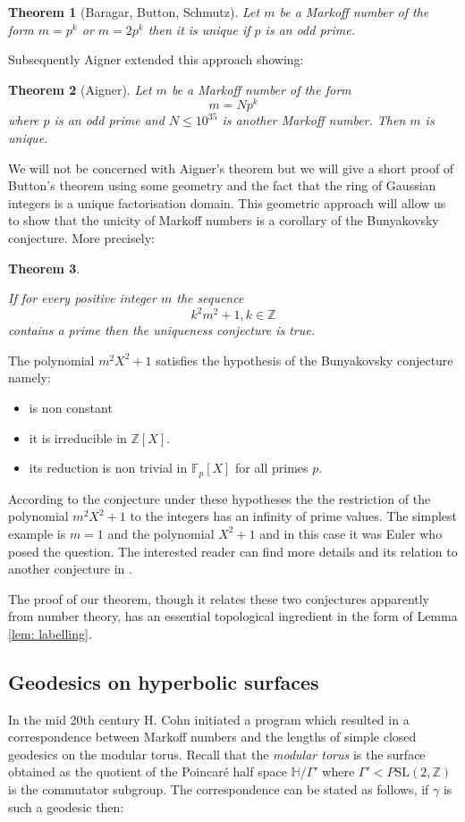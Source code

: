\documentclass[12pt,a4paper]{amsart}
\newtheorem{thm}{Theorem}[section]
\def\HH{\mathbb{H}}
\def\ZZ{\mathbb{Z}}
\def\sl2{\mathrm{SL}(2, \ZZ)}
\begin{document}
 \begin{thm}[Baragar, Button, Schmutz] \label{button}
 Let $m$ be a Markoff number of the form 
 $m=p^k$ or $m=2p^k$ then it is unique
if $p$ is an odd prime.
 \end{thm}


Subsequently Aigner extended  this approach showing:
 
 \begin{thm}[Aigner]
 Let $m$ be a Markoff number of the form 
 $$m =Np^k$$
 where $p$ is an odd prime and $N \leq 10^{35}$ is another Markoff number. Then $m$ is unique.
 \end{thm}

We will not be concerned with Aigner's theorem but we will give a short proof
of Button's theorem using some geometry and the fact that the ring of Gaussian
integers is a unique factorisation domain. This geometric approach will allow
us to show that the unicity of Markoff numbers is a corollary of the
Bunyakovsky conjecture. More precisely:

\begin{thm}\label{main}

If for every positive integer $m$ the sequence $$k^2m^2 + 1, k \in \ZZ$$ contains a
prime then the uniqueness conjecture is true.

\end{thm}

The polynomial $m^2 X^2 + 1$ satisfies the hypothesis of the Bunyakovsky conjecture namely:
\begin{itemize}
\item is non constant
\item it is irreducible in  $\ZZ[X]$.
\item its reduction is non trivial in $\mathbb{F}_p[X]$ for all primes $p$.
\end{itemize}

According to the conjecture under these hypotheses the the restriction of the
polynomial  $m^2 X^2 + 1$ to the integers has an infinity of prime values. The
simplest example is $m=1$ and the polynomial $X^2 + 1$ and in this case it was
Euler who posed the question. The interested reader can find more details and
its relation to another conjecture in \cite{Pollack}.

The proof of our theorem, though it relates these two conjectures apparently from
number theory, has an essential topological ingredient in the form of Lemma
\ref{lem: labelling}.


\subsection{Geodesics on hyperbolic surfaces} In the mid 20th century H. Cohn
initiated a program which resulted in a correspondence between Markoff numbers
and the lengths of simple closed geodesics on the modular torus. Recall that
the \textit{modular torus} is the surface obtained as the quotient of the
Poincar\'e half space $\HH/\Gamma'$ where $\Gamma' < P\sl2$ is the commutator
subgroup. The correspondence can be stated as follows, if $\gamma$ is such a
geodesic then: 
\end{document}

